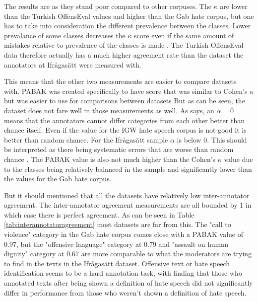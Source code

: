 \documentclass[nofilelist]{cslthse-msc}
\begin{document}
The results are as they stand poor compared to other corpuses. The $\kappa$ are lower than the Turkish OffensEval values and higher than the Gab hate corpus, but one has to take into consideration the different prevalence between the classes. Lower prevalance of some classes decreases the $\kappa$ score even if the same amount of mistakes relative to prevalence of the classes is made \citep{byrt1993bias}. The Turkish OffensEval data therefore actually has a much higher agreement rate than the dataset the annotators at Ifrågasätt were measured with. 

This means that the other two measurements are easier to compare datasets with. PABAK was created specifically to have score that was similar to Cohen's $\kappa$ but was easier to use for comparisons between datasets \citep{byrt1993bias} But as can be seen, the dataset does not fare well in those measurements as well. As \citet{krippendorff2011computing} says, an $\alpha = 0$ means that the annotators cannot differ categories from each other better than chance itself. Even if the value for the IGW hate speech corpus is not good it is better than random chance. For the Ifrågasätt sample $\alpha$ is below  $0$. This should be interpreted as there being systematic errors that are worse than random chance \citep{krippendorff2011computing}. The PABAK value is also not much higher than the Cohen's $\kappa$ value due to the classes being relatively balanced in the sample and significantly lower than the values for the Gab hate corpus.

But it should mentioned that all the datasets have relatively low inter-annotator agreement. The inter-annotator agreement measurements are all bounded by 1 in which case there is perfect agreement. As can be seen in Table \ref{tab:interannotatoragreement} most datasets are far from this. The "call to violence" category in the Gab hate corpus comes close with a PABAK value of 0.97, but the "offensive language" category at 0.79 and "assault on human dignity" category at 0.67 are more comparable to what the moderators are trying to find in the texts in the Ifrågasätt dataset. Offensive text or hate speech identification seems to be a hard annotation task, with \citet{DBLP:journals/corr/RossRCCKW17} finding that those who annotated texts after being shown a definition of hate speech did not significantly differ in performance from those who weren't shown a definition of hate speech.
\end{document}

